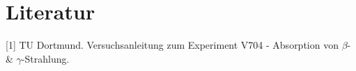 \section{Literatur}

[1] TU Dortmund. Versuchsanleitung zum Experiment V704 - Absorption von $\beta$- \& $\gamma$-Strahlung.